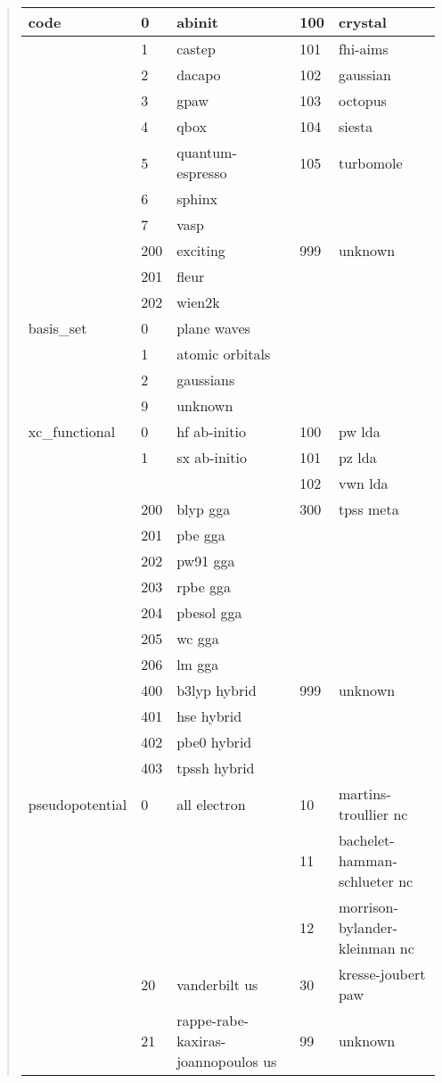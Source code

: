 \documentclass[letterpaper,10pt,english]{sphinxmanual}
\begin{document}
\begin{quote}
\begin{longtable}{|l|l|l|l|l|}
code
 & 
0
 & 
abinit
 & 
100
 & 
crystal
\\
\hline & 
1
 & 
castep
 & 
101
 & 
fhi-aims
\\
\hline & 
2
 & 
dacapo
 & 
102
 & 
gaussian
\\
\hline & 
3
 & 
gpaw
 & 
103
 & 
octopus
\\
\hline & 
4
 & 
qbox
 & 
104
 & 
siesta
\\
\hline & 
5
 & 
quantum-espresso
 & 
105
 & 
turbomole
\\
\hline & 
6
 & 
sphinx
 &  & \\
\hline & 
7
 & 
vasp
 &  & \\
\hline & 
200
 & 
exciting
 & 
999
 & 
unknown
\\
\hline & 
201
 & 
fleur
 &  & \\
\hline & 
202
 & 
wien2k
 &  & \\
\hline
basis\_set
 & 
0
 & 
plane waves
 &  & \\
\hline & 
1
 & 
atomic orbitals
 &  & \\
\hline & 
2
 & 
gaussians
 &  & \\
\hline & 
9
 & 
unknown
 &  & \\
\hline
xc\_functional
 & 
0
 & 
hf ab-initio
 & 
100
 & 
pw lda
\\
\hline & 
1
 & 
sx ab-initio
 & 
101
 & 
pz lda
\\
\hline &  &  & 
102
 & 
vwn lda
\\
\hline & 
200
 & 
blyp gga
 & 
300
 & 
tpss meta
\\
\hline & 
201
 & 
pbe gga
 &  & \\
\hline & 
202
 & 
pw91 gga
 &  & \\
\hline & 
203
 & 
rpbe gga
 &  & \\
\hline & 
204
 & 
pbesol gga
 &  & \\
\hline & 
205
 & 
wc gga
 &  & \\
\hline & 
206
 & 
lm gga
 &  & \\
\hline & 
400
 & 
b3lyp hybrid
 & 
999
 & 
unknown
\\
\hline & 
401
 & 
hse hybrid
 &  & \\
\hline & 
402
 & 
pbe0 hybrid
 &  & \\
\hline & 
403
 & 
tpssh hybrid
 &  & \\
\hline
pseudopotential
 & 
0
 & 
all electron
 & 
10
 & 
martins-troullier nc
\\
\hline &  &  & 
11
 & 
bachelet-hamman-schlueter nc
\\
\hline &  &  & 
12
 & 
morrison-bylander-kleinman nc
\\
\hline & 
20
 & 
vanderbilt us
 & 
30
 & 
kresse-joubert paw
\\
\hline & 
21
 & 
rappe-rabe-kaxiras-joannopoulos us
 & 
99
 & 
unknown
\\
\hline\end{longtable}

\end{quote}
\end{document}
